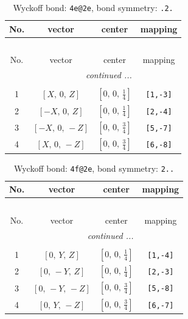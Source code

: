 \documentclass[fleqn,8pt]{jsarticle}
\begin{document}
\renewcommand{\arraystretch}{1.2}
\begin{longtable}{cccc}
\caption{Wyckoff bond: {\tt 4e@2e}, bond symmetry: {\tt .2.}}
 \\
 \hline \hline
No. & vector & center & mapping \\ \hline \endfirsthead

\multicolumn{3}{l}{\tablename\ \thetable{}} \\
 \hline \hline
No. & vector & center & mapping \\ \hline \endhead

 \hline \hline
\multicolumn{3}{r}{\footnotesize\it continued ...} \\ \endfoot

 \hline \hline
\multicolumn{3}{r}{} \\ \endlastfoot

1 & $\left[ X,\, 0,\, Z \right]$ & $\left[ 0,\, 0,\, \frac{1}{4} \right]$ & {\tt [1,-3]} \\ \hline
2 & $\left[ - X,\, 0,\, Z \right]$ & $\left[ 0,\, 0,\, \frac{1}{4} \right]$ & {\tt [2,-4]} \\ \hline
3 & $\left[ - X,\, 0,\, - Z \right]$ & $\left[ 0,\, 0,\, \frac{3}{4} \right]$ & {\tt [5,-7]} \\ \hline
4 & $\left[ X,\, 0,\, - Z \right]$ & $\left[ 0,\, 0,\, \frac{3}{4} \right]$ & {\tt [6,-8]} \\
\end{longtable}
\renewcommand{\arraystretch}{1.2}
\begin{longtable}{cccc}
\caption{Wyckoff bond: {\tt 4f@2e}, bond symmetry: {\tt 2..}}
 \\
 \hline \hline
No. & vector & center & mapping \\ \hline \endfirsthead

\multicolumn{3}{l}{\tablename\ \thetable{}} \\
 \hline \hline
No. & vector & center & mapping \\ \hline \endhead

 \hline \hline
\multicolumn{3}{r}{\footnotesize\it continued ...} \\ \endfoot

 \hline \hline
\multicolumn{3}{r}{} \\ \endlastfoot

1 & $\left[ 0,\, Y,\, Z \right]$ & $\left[ 0,\, 0,\, \frac{1}{4} \right]$ & {\tt [1,-4]} \\ \hline
2 & $\left[ 0,\, - Y,\, Z \right]$ & $\left[ 0,\, 0,\, \frac{1}{4} \right]$ & {\tt [2,-3]} \\ \hline
3 & $\left[ 0,\, - Y,\, - Z \right]$ & $\left[ 0,\, 0,\, \frac{3}{4} \right]$ & {\tt [5,-8]} \\ \hline
4 & $\left[ 0,\, Y,\, - Z \right]$ & $\left[ 0,\, 0,\, \frac{3}{4} \right]$ & {\tt [6,-7]} \\
\end{longtable}
\end{document}
